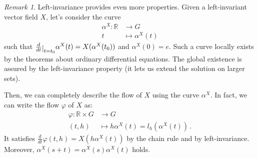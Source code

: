 \documentclass[a4paper,11pt,titlepage, article, oneside]{memoir}
\numberwithin{equation}{section}
\theoremstyle{definition}
\theoremstyle{remark}
\newtheorem{remark}[theorem]{Remark}
\newcommand{\rfield}{\mathbb{R}}
\newcommand{\restrict}[2]{{#1}\raisebox{-.5ex}{$|$}_{#2}}
\newcommand{\diondi}[1]{\frac{d}{d{#1}}}
\begin{document}
\begin{remarkbox} \begin{remark} \label{alphacurve}
Left-invariance provides even more properties. Given a left-invariant vector field $X$, let's consider the curve
\begin{align}
\alpha^X \colon \rfield &\rightarrow G \\
t &\mapsto \alpha^X(t) \nonumber
\end{align}
such that $\restrict{\diondi{t}}{t=t_0} \alpha^X(t) = X(\alpha^X(t_0))$ and $\alpha^X(0)=e$. Such a curve locally exists by the theorems about ordinary differential equations. The global existence is assured by the left-invariance property (it lets us extend the solution on larger sets).

Then, we can completely describe the flow of $X$ using the curve $\alpha^X$. In fact, we can write the flow $\varphi$ of $X$ as:
\begin{align} 
\varphi \colon \rfield \times G & \rightarrow G \\
(t, h) &\mapsto h \alpha^X(t) = l_h (\alpha^X(t)) \, . \nonumber
\end{align}
It satisfies $\diondi{t} \varphi(t, h) = X(h \alpha^X (t))$ by the chain rule and by left-invariance. Moreover, $\alpha^X(s+t) = \alpha^X(s) \alpha^X(t)$ holds.
\end{remark} \end{remarkbox}
\end{document}

